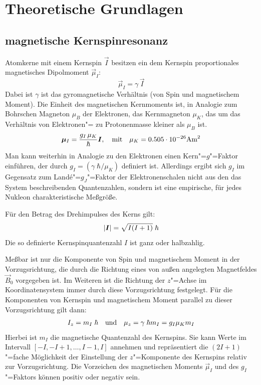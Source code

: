 \chapter{Theoretische Grundlagen}

\section{magnetische Kernspinresonanz}

Atomkerne mit einem Kernspin $\vec I$ besitzen ein dem Kernspin proportionales magnetisches Dipolmoment $\vec
\mu_I$:
	\[
		\vec \mu_I=\gamma\,\vec I
	\]
Dabei ist $\gamma$ ist das gyromagnetische Verhältnis (von Spin und magnetischem Moment). Die
Einheit des magnetischen Kernmoments ist, in Analogie zum Bohrschen Magneton $\mu_B$ der
Elektronen, das Kernmagneton $\mu_K$, das um das Verhältnis von Elektronen"= zu Protonenmasse
kleiner als $\mu_B$ ist.
	\[
		\bm\mu_I=\frac{g_I\,\mu_K}{\hbar}\bm I,\quad\text{mit}\quad\mu_K=0.505\cdot10^{-26}\text{Am}^2
	\]
Man kann weiterhin in Analogie zu den Elektronen einen Kern"=$g$"=Faktor einführen, der durch
$g_I=(\gamma\;\hbar/\mu_K)$ definiert ist. Allerdings ergibt sich $g_I$ im Gegensatz zum
Landé"=$g_J$"=Faktor der Elektronenschalen nicht aus den das System beschreibenden
Quantenzahlen, sondern ist eine empirische, für jedes Nukleon charakteristische Meßgröße.

Für den Betrag des Drehimpulses des Kerns gilt:
	\[
		\abs{\vec I}=\sqrt{I(I+1)}\;\hbar
	\]
Die so definierte Kernspinquantenzahl $I$ ist ganz oder halbzahlig.

Meßbar ist nur die Komponente von Spin und magnetischem Moment in der Vorzugsrichtung, die durch
die Richtung eines von außen angelegten Magnetfeldes $\vec B_0$ vorgegeben ist. Im Weiteren ist
die Richtung der $z$"=Achse im Koordinatensystem immer durch diese Vorzugsrichtung festgelegt. Für
die Komponenten von Kernspin und magnetischem Moment parallel zu dieser Vorzugsrichtung gilt
dann:
	\[
		I_z = m_I\;\hbar\quad\text{und}\quad\mu_z=\gamma\;\hbar m_I=g_I\mu_Km_I
	\]
Hierbei ist $m_I$ die magnetische Quantenzahl des Kernspins. Sie kann Werte im Intervall $[-I,
-I+1, \ldots, I-1, I]$ annehmen und repräsentiert die $(2I+1)$"=fache Möglichkeit der Einstellung
der $z$"=Komponente des Kernspins relativ zur Vorzugsrichtung. Die Vorzeichen des magnetischen
Moments $\vec\mu_I$ und des $g_I$"=Faktors können positiv oder negativ sein.

